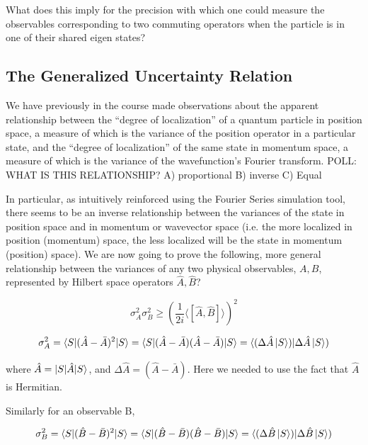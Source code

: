 \documentclass{article}
\begin{document}
What does this imply for the precision with which one could measure the observables corresponding to two commuting operators when the particle is in one of their shared eigen states?  

\subsection{The Generalized Uncertainty Relation}

We have previously in the course made observations about the apparent relationship between the “degree of localization” of a quantum particle in position space, a measure of which is the variance of the position operator in a particular state, and the “degree of localization” of the same state in momentum space, a measure of which is the variance of the wavefunction’s Fourier transform.  POLL: WHAT IS THIS RELATIONSHIP? A) proportional B) inverse C) Equal


In particular, as intuitively reinforced using the Fourier Series simulation tool, there seems to be an inverse relationship between the variances of the state in position space and in momentum or wavevector space (i.e. the more localized in position (momentum) space, the less localized will be the state in momentum (position) space).  We are now going to prove the following, more general relationship between the variances of any two physical observables, $A,B$, represented by Hilbert space operators $\hat{A}, \hat{B}$?

$$\sigma_A^2 \sigma_B^2 \geq \left( \frac{1}{2i} \langle \left[ \hat{A}, \hat{B} \right] \rangle \right)^2$$

$$\sigma_A^2 = \braket{S|(\hat{A} - \bar{A})^2|S} = \braket{S|(\hat{A} - \bar{A} )(\hat{A} - \bar{A})|S} = \langle (\Delta \hat{A} \ket{S}) | \Delta \hat{A} \ket{S})$$

where $\hat{A} =\ket{S|\hat{A}|S}$, and $\Delta \hat{A} = \left(\hat{A} - \bar{A} \right)$. Here we needed to use the fact that $\hat{A}$ is Hermitian. 

Similarly for an observable B,

$$\sigma_B^2 = \braket{S|(\hat{B} - \bar{B})^2|S} = \braket{S|(\hat{B} - \bar{B} )(\hat{B} - \bar{B})|S} = \langle (\Delta \hat{B} \ket{S}) | \Delta \hat{B} \ket{S})$$

\end{document}

